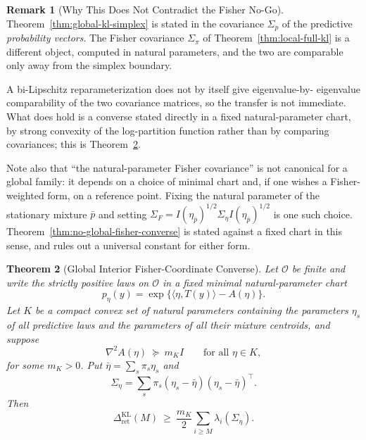 \documentclass[12pt]{article}
\newtheorem{theorem}{Theorem}[section]
\theoremstyle{definition}
\newtheorem{remark}[theorem]{Remark}
\newcommand{\RetKL}{\Delta_{\mathrm{ret}}^{\mathrm{KL}}}
\begin{document}
\begin{remark}[Why This Does Not Contradict the Fisher No-Go]
\label{rem:simplex-vs-fisher}
Theorem~\ref{thm:global-kl-simplex} is stated in the covariance $\Sigma_p$ of
the predictive \emph{probability vectors}.  The Fisher covariance
$\Sigma_\pi$ of Theorem~\ref{thm:local-full-kl} is a different object, computed
in natural parameters, and the two are comparable only away from the simplex
boundary.

A bi-Lipschitz reparameterization does not by itself give eigenvalue-by-
eigenvalue comparability of the two covariance matrices, so the transfer is not
immediate.  What does hold is a converse stated directly in a fixed
natural-parameter chart, by strong convexity of the log-partition function
rather than by comparing covariances; this is
Theorem~\ref{thm:global-interior-fisher}.

Note also that ``the natural-parameter Fisher covariance'' is not canonical for
a global family: it depends on a choice of minimal chart and, if one wishes a
Fisher-weighted form, on a reference point.  Fixing the natural parameter of
the stationary mixture $\bar p$ and setting
$\Sigma_F=I(\eta_{\bar p})^{1/2}\Sigma_\eta I(\eta_{\bar p})^{1/2}$ is one such
choice.  Theorem~\ref{thm:no-global-fisher-converse} is stated against a fixed
chart in this sense, and rules out a universal constant for either form.
\end{remark}

\begin{theorem}[Global Interior Fisher-Coordinate Converse]
\label{thm:global-interior-fisher}
Let $\mathcal O$ be finite and write the strictly positive laws on
$\mathcal O$ in a fixed minimal natural-parameter chart
\[
p_\eta(y)=\exp\bigl\{\langle\eta,T(y)\rangle-A(\eta)\bigr\}.
\]
Let $K$ be a compact convex set of natural parameters containing the
parameters $\eta_s$ of all predictive laws \emph{and the parameters of all
their mixture centroids}, and suppose
\[
\nabla^2A(\eta)\ \succeq\ m_K I
\qquad\text{for all }\eta\in K,
\]
for some $m_K>0$.  Put $\bar\eta=\sum_s\pi_s\eta_s$ and
\[
\Sigma_\eta=\sum_s\pi_s(\eta_s-\bar\eta)(\eta_s-\bar\eta)^{\!\top}.
\]
Then
\[
\RetKL(M)\ \ge\ \frac{m_K}{2}\sum_{i\ge M}\lambda_i(\Sigma_\eta).
\]
\end{theorem}
\end{document}
